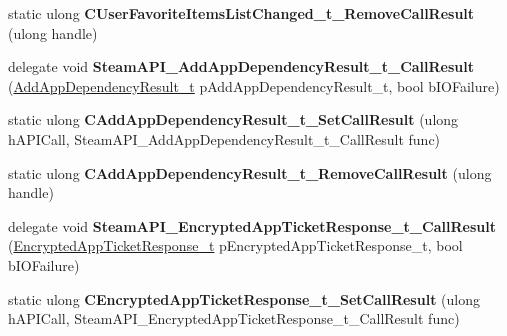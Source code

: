 \begin{DoxyCompactItemize}
\mbox{\label{class_valve_1_1_interop_1_1_native_entrypoints_a809ce8b3425b691414792b35e61e1479}} 
static ulong {\bfseries C\+User\+Favorite\+Items\+List\+Changed\+\_\+t\+\_\+\+Remove\+Call\+Result} (ulong handle)
\item 
\mbox{\label{class_valve_1_1_interop_1_1_native_entrypoints_a31c8259d4e88d54f6ff7a29465fddc3f}} 
delegate void {\bfseries Steam\+A\+P\+I\+\_\+\+Add\+App\+Dependency\+Result\+\_\+t\+\_\+\+Call\+Result} (\hyperlink{struct_valve_1_1_steamworks_1_1_add_app_dependency_result__t}{Add\+App\+Dependency\+Result\+\_\+t} p\+Add\+App\+Dependency\+Result\+\_\+t, bool b\+I\+O\+Failure)
\item 
\mbox{\label{class_valve_1_1_interop_1_1_native_entrypoints_aa7671164e4ad6fbab146caa2a4e04573}} 
static ulong {\bfseries C\+Add\+App\+Dependency\+Result\+\_\+t\+\_\+\+Set\+Call\+Result} (ulong h\+A\+P\+I\+Call, Steam\+A\+P\+I\+\_\+\+Add\+App\+Dependency\+Result\+\_\+t\+\_\+\+Call\+Result func)
\item 
\mbox{\label{class_valve_1_1_interop_1_1_native_entrypoints_add2c8325d9366167d6772e247f4da2d6}} 
static ulong {\bfseries C\+Add\+App\+Dependency\+Result\+\_\+t\+\_\+\+Remove\+Call\+Result} (ulong handle)
\item 
\mbox{\label{class_valve_1_1_interop_1_1_native_entrypoints_ab30e838bcf7c324d739760c4820b0185}} 
delegate void {\bfseries Steam\+A\+P\+I\+\_\+\+Encrypted\+App\+Ticket\+Response\+\_\+t\+\_\+\+Call\+Result} (\hyperlink{struct_valve_1_1_steamworks_1_1_encrypted_app_ticket_response__t}{Encrypted\+App\+Ticket\+Response\+\_\+t} p\+Encrypted\+App\+Ticket\+Response\+\_\+t, bool b\+I\+O\+Failure)
\item 
\mbox{\label{class_valve_1_1_interop_1_1_native_entrypoints_ab310acfc667f55d3a074c4c6ddd146d5}} 
static ulong {\bfseries C\+Encrypted\+App\+Ticket\+Response\+\_\+t\+\_\+\+Set\+Call\+Result} (ulong h\+A\+P\+I\+Call, Steam\+A\+P\+I\+\_\+\+Encrypted\+App\+Ticket\+Response\+\_\+t\+\_\+\+Call\+Result func)
\item 

\end{DoxyCompactItemize}
